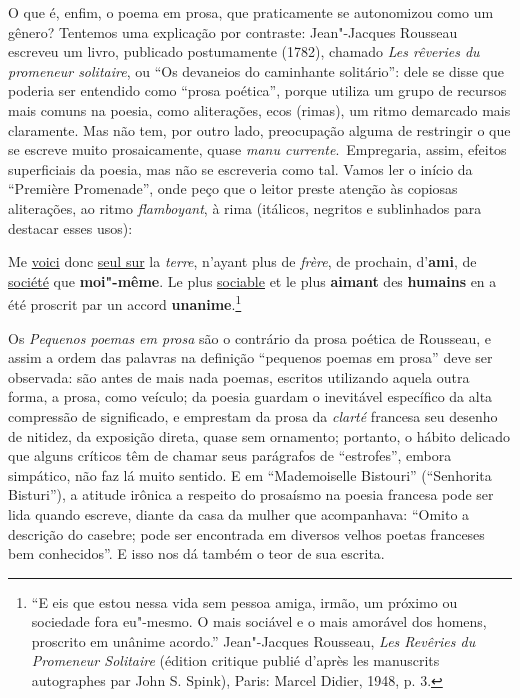 O que é, enfim, o poema em prosa, que praticamente se autonomizou como
um gênero? Tentemos uma explicação por contraste: Jean"-Jacques
Rousseau escreveu um livro, publicado postumamente (1782), chamado
\textit{Les rêveries du promeneur solitaire}, ou “Os devaneios do
caminhante solitário”: dele se disse que poderia ser entendido como
“prosa poética”, porque utiliza um grupo de recursos mais comuns na
poesia, como aliterações, ecos (rimas), um ritmo demarcado mais
claramente. Mas não tem, por outro lado, preocupação alguma de
restringir o que se escreve muito prosaicamente, quase \textit{manu
currente}.~Empregaria, assim, efeitos superficiais da poesia, mas não
se escreveria como tal. Vamos ler o início da “Première Promenade”,
onde peço que o leitor preste atenção às copiosas aliterações, ao ritmo
\textit{flamboyant}, à rima (itálicos, negritos e sublinhados para
destacar esses usos):


\begin{hedraquote}
Me \underline{voici} donc \underline{seul sur} la \textit{terre}, n’ayant plus
de \textit{frère}, de prochain, d’\textbf{ami}, de \underline{société} que
\textbf{moi"-même}. Le plus \underline{sociable} et le plus \textbf{aimant} des \textbf{humains} en a été
proscrit par un accord \textbf{unanime}.\footnote{ “E eis que estou nessa vida sem pessoa amiga, irmão, um próximo ou
sociedade fora eu"-mesmo. O mais sociável e o mais amorável dos homens,
proscrito em unânime acordo.” Jean"-Jacques Rousseau,  \textit{Les
Revêries du Promeneur Solitaire} (édition critique publié d’après les
manuscrits autographes par John S. Spink), Paris: Marcel
Didier, 1948, p. 3.}
\end{hedraquote}

Os \textit{Pequenos poemas em prosa} são o contrário da prosa poética de Rousseau,
 e assim a ordem das palavras na definição “pequenos poemas em prosa” 
deve ser observada: são antes de mais nada poemas, escritos utilizando 
aquela outra forma, a prosa, como veículo; da poesia guardam o inevitável 
específico da alta compressão de significado, e emprestam da prosa da \textit{clarté}
 francesa seu desenho de nitidez, da exposição direta, quase sem ornamento; 
portanto, o hábito delicado que alguns críticos têm de chamar 
seus parágrafos de “estrofes”, embora simpático, não faz lá muito sentido. E
em “Mademoiselle Bistouri” (“Senhorita Bisturi”), a atitude irônica a
respeito do prosaísmo na poesia francesa pode ser lida quando escreve,
diante da casa da mulher que acompanhava: “Omito a descrição do
casebre; pode ser encontrada em diversos velhos poetas franceses bem
conhecidos”. E isso nos dá também o teor de sua escrita.

